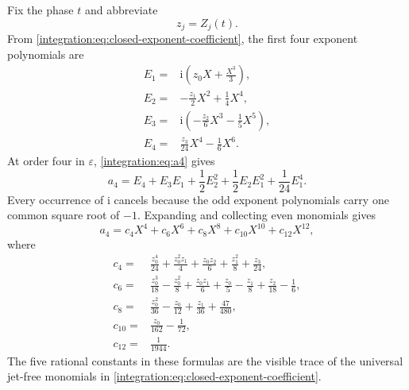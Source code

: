 \documentclass[11pt,oneside]{article}
\theoremstyle{definition}
\theoremstyle{remark}
\newcommand{\ii}{\mathrm i}
\begin{document}
Fix the phase $t$ and abbreviate
\begin{equation}
 z_j=Z_j(t).
 \label{integration:eq:zj-abbreviation}
\end{equation}
From \eqref{integration:eq:closed-exponent-coefficient}, the first four exponent polynomials are
\begin{align}
 E_1={}&\ii\left(z_0X+\frac{X^3}{3}\right),                 \label{integration:eq:E1-explicit}\\
 E_2={}&-\frac{z_1}{2}X^2+\frac14X^4,                       \label{integration:eq:E2-explicit}\\
 E_3={}&\ii\left(-\frac{z_2}{6}X^3-\frac15X^5\right),      \label{integration:eq:E3-explicit}\\
 E_4={}&\frac{z_3}{24}X^4-\frac16X^6.                      \label{integration:eq:E4-explicit}
\end{align}
At order four in $\varepsilon$, \eqref{integration:eq:a4} gives
\begin{equation}
 a_4=E_4+E_3E_1+\frac12E_2^2
     +\frac12E_2E_1^2+\frac1{24}E_1^4.
 \label{integration:eq:a4-saddle}
\end{equation}
Every occurrence of $\ii$ cancels because the odd exponent polynomials carry one common
square root of $-1$.  Expanding and collecting even monomials gives
\begin{equation}
 a_4=c_4X^4+c_6X^6+c_8X^8+c_{10}X^{10}+c_{12}X^{12},
 \label{integration:eq:a4-even-polynomial}
\end{equation}
where
\begin{align}
 c_4={}&\frac{z_0^4}{24}+\frac{z_0^2z_1}{4}
       +\frac{z_0z_2}{6}+\frac{z_1^2}{8}+\frac{z_3}{24},     \label{integration:eq:c4}\\
 c_6={}&\frac{z_0^3}{18}-\frac{z_0^2}{8}+\frac{z_0z_1}{6}
       +\frac{z_0}{5}-\frac{z_1}{8}+\frac{z_2}{18}-\frac16, \label{integration:eq:c6}\\
 c_8={}&\frac{z_0^2}{36}-\frac{z_0}{12}+\frac{z_1}{36}
       +\frac{47}{480},                                      \label{integration:eq:c8}\\
 c_{10}={}&\frac{z_0}{162}-\frac1{72},                       \label{integration:eq:c10}\\
 c_{12}={}&\frac1{1944}.                                     \label{integration:eq:c12}
\end{align}
The five rational constants in these formulas are the visible trace of the universal
jet-free monomials in \eqref{integration:eq:closed-exponent-coefficient}.
\end{document}
